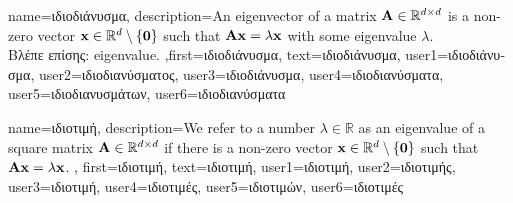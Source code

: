 {name={\foreignlanguage{greek}{ιδιοδιάνυσμα}}, 
	description={An 
		eigenvector of a matrix $\mathbf{A} \in \mathbb{R}^{d \times d}$ 
		is a non-zero vector ${\bf x} \in \mathbb{R}^{d} \setminus \{ \mathbf{0} \}$ 
		such that $\mathbf{A} {\bf x} = \lambda {\bf x}$ with some \gls{eigenvalue} $\lambda$.\\
		\foreignlanguage{greek}{Βλέπε επίσης:} \gls{eigenvalue}.
		},first={\foreignlanguage{greek}{ιδιοδιάνυσμα}},
		text={\foreignlanguage{greek}{ιδιοδιάνυσμα}},
		user1={\foreignlanguage{greek}{ιδιοδιάνυσμα}}, %
		user2={\foreignlanguage{greek}{ιδιοδιανύσματος}}, %
		user3={\foreignlanguage{greek}{ιδιοδιάνυσμα}}, %
		user4={\foreignlanguage{greek}{ιδιοδιανύσματα}}, %
		user5={\foreignlanguage{greek}{ιδιοδιανυσμάτων}}, %
		user6={\foreignlanguage{greek}{ιδιοδιανύσματα}} %
}

{name={\foreignlanguage{greek}{ιδιοτιμή}}, 
	description={We refer to a 
		number $\lambda \in \mathbb{R}$ as an eigenvalue of a square matrix $\mathbf{A} \in \mathbb{R}^{d \times d}$ 
		if there is a non-zero vector ${\bf x} \in \mathbb{R}^{d} \setminus \{ \mathbf{0} \}$ such that $\mathbf{A} {\bf x} = \lambda {\bf x}$. },
		first={\foreignlanguage{greek}{ιδιοτιμή}},
		text={\foreignlanguage{greek}{ιδιοτιμή}},
		user1={\foreignlanguage{greek}{ιδιοτιμή}}, %
		user2={\foreignlanguage{greek}{ιδιοτιμής}}, %
		user3={\foreignlanguage{greek}{ιδιοτιμή}}, %
		user4={\foreignlanguage{greek}{ιδιοτιμές}}, %
		user5={\foreignlanguage{greek}{ιδιοτιμών}}, %
		user6={\foreignlanguage{greek}{ιδιοτιμές}} %
}

